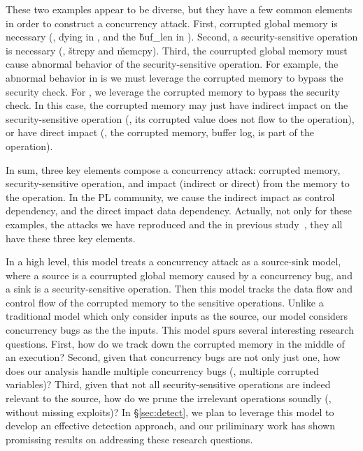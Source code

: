 These two examples appear to be diverse, but they have a few common elements in 
order to construct a concurrency attack. First, corrupted global memory is 
necessary (\eg, \v{dying} in \libsafe, and the \v{buf\_len} in \apache). 
Second, a security-sensitive operation is necessary (\eg, \v{strcpy} and 
\v{memcpy}). Third, the courrupted global memory must cause abnormal behavior of 
the security-sensitive operation. For example, the abnormal behavior in \libsafe 
is we must leverage the corrupted memory to bypass the security check. For 
\apache, we leverage the corrupted memory to bypass the security check. In this 
case, the corrupted memory may just have indirect impact on the 
security-sensitive operation (\ie, its corrupted value does not flow to the 
operation), or have direct impact (\ie, the corrupted memory, buffer log, is 
part of the operation).

In sum, three key elements compose a concurrency attack: corrupted memory, 
security-sensitive operation, and impact (indirect or direct) from the memory 
to the operation. In the PL community, we cause the indirect impact as control 
dependency, and the direct impact data dependency. Actually, not only for these 
examples, the \nattacks attacks we have reproduced and the \noldattacks in 
previous study~\cite{con:hotpar12}, they all have these three key elements.

In a high level, this model treats a concurrency attack as a source-sink model, 
where a source is a courrupted global memory caused by a concurrency bug, and a 
sink is a security-sensitive operation. Then this model tracks the data flow 
and control flow of the corrupted memory to the sensitive operations. Unlike a 
traditional model which only consider inputs as the source, our model considers
concurrency bugs as the the inputs. This model spurs several interesting 
research questions. First, how do we track down the corrupted memory in the 
middle of an execution? Second, given that concurrency bugs are not only just 
one, how does our analysis handle multiple concurrency bugs (\eg, multiple 
corrupted variables)? Third, given that not all security-sensitive operations 
are indeed relevant to the source, how do we prune the irrelevant operations 
soundly (\ie, without missing exploits)? In \S\ref{sec:detect}, we plan to 
leverage this model to develop an effective detection approach, and our 
priliminary work has shown promissing results on addressing these research 
questions.

